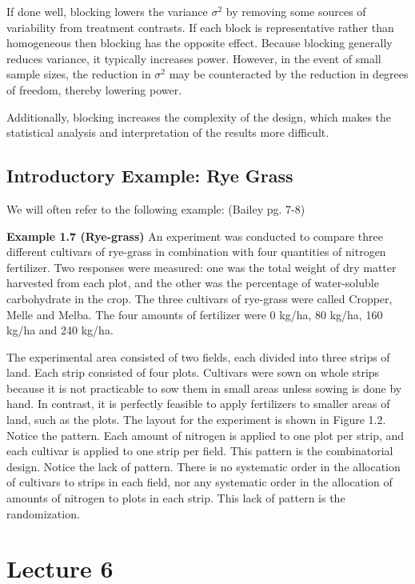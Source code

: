 \documentclass{tufte-book}
\begin{document}
If done well, blocking lowers the variance $\sigma^{2}$ by removing some sources of variability from treatment contrasts. 
If each block is representative rather than homogeneous then blocking has the opposite effect. Because blocking generally 
reduces variance, it typically increases power. However, in the event of small sample sizes, the reduction in $\sigma^{2}$ 
may be counteracted by the reduction in degrees of freedom, thereby lowering power. \newline

Additionally, blocking increases the complexity of the design, which makes the statistical analysis and interpretation
of the results more difficult.

\subsection{Introductory Example: Rye Grass}

We will often refer to the following example: (Bailey pg. 7-8)

\textbf{Example 1.7 (Rye-grass)} An experiment was conducted to compare three different cultivars
of rye-grass in combination with four quantities of nitrogen fertilizer. Two responses were
measured: one was the total weight of dry matter harvested from each plot, and the other was
the percentage of water-soluble carbohydrate in the crop.
The three cultivars of rye-grass were called Cropper, Melle and Melba. The four amounts of fertilizer were 0 kg/ha, 
80 kg/ha, 160 kg/ha and 240 kg/ha. \newline

The experimental area consisted of two fields, each divided into three strips of land. Each
strip consisted of four plots. Cultivars were sown on whole strips because it is not practicable to sow them in small
areas unless sowing is done by hand. In contrast, it is perfectly feasible to apply fertilizers to
smaller areas of land, such as the plots. The layout for the experiment is shown in Figure 1.2.
Notice the pattern. Each amount of nitrogen is applied to one plot per strip, and each
cultivar is applied to one strip per field. This pattern is the combinatorial design.
Notice the lack of pattern. There is no systematic order in the allocation of cultivars to
strips in each field, nor any systematic order in the allocation of amounts of nitrogen to plots
in each strip. This lack of pattern is the randomization.

\section{Lecture 6}
\end{document}
